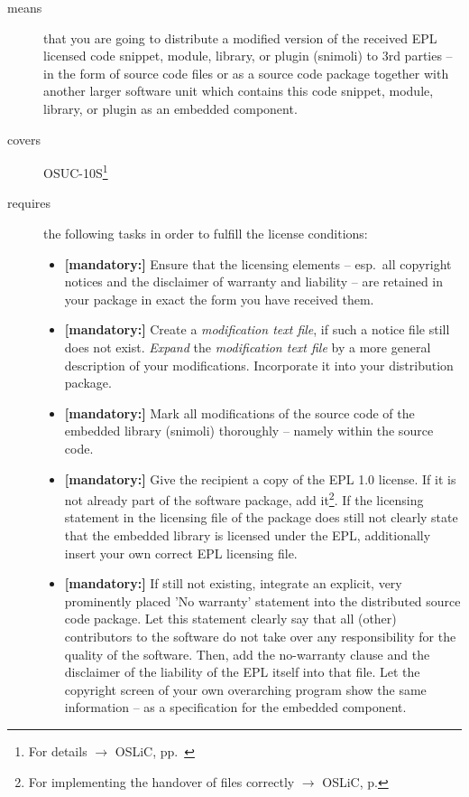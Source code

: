 \begin{description}
\item[means] that you are going to distribute a modified version of the received
EPL licensed code snippet, module, library, or plugin (snimoli) to 3rd parties
-- in the form of source code files or as a source code package together with
another larger software unit which contains this code snippet, module, library,
or plugin as an embedded component.
\item[covers] OSUC-10S\footnote{For details $\rightarrow$ OSLiC, pp.\
\pageref{OSUC-10S-DEF}}
\item[requires] the following tasks in order to fulfill the license conditions:
\begin{itemize}

  \item \textbf{[mandatory:]} Ensure that the licensing elements -- esp.\ all
  copyright notices and the disclaimer of warranty and liability -- are retained
  in your package in exact the form you have received them.

  \item \textbf{[mandatory:]} Create a \emph{modification text file}, if such a
  notice file still does not exist. \emph{Expand} the \emph{modification text
  file} by a more general description of your modifications. Incorporate it into
  your distribution package.
  
  \item \textbf{[mandatory:]} Mark all modifications of the source code of the
  embedded library (snimoli) thoroughly -- namely within the source code.
   
  \item \textbf{[mandatory:]} Give the recipient a copy of the EPL 1.0 license.
  If it is not already part of the software package, add it\footnote{For
  implementing the handover of files correctly $\rightarrow$ OSLiC, p.
  \pageref{DistributingFilesHint}}. If the licensing statement in the licensing
  file of the package does still not clearly state that the embedded library is
  licensed under the EPL, additionally insert your own correct EPL licensing file.

  \item \textbf{[mandatory:]} If still not existing, integrate an explicit, very
  prominently placed 'No warranty' statement into the distributed source code
  package. Let this statement clearly say that all (other) contributors to the
  software do not take over any responsibility for the quality of the software.
  Then, add the no-warranty clause and the disclaimer of the liability of the
  EPL itself into that file. Let the copyright screen of your own overarching
  program show the same information -- as a specification for the embedded
  component.


\end{itemize}
\end{description}
